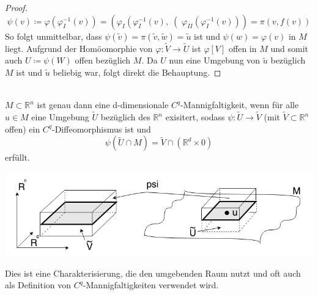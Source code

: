 \begin{proof}
\begin{equation*}
\psi (v) \coloneqq \varphi \left(\varphi_I ^{-1} (v) \right) =
\left( \varphi_I \left(\varphi_I ^{-1} (v),\right( 
\varphi_{II} \left(\varphi_I ^ {-1} (v) \right) \right) = \pi \left(v, f(v)\right)
\end{equation*}
\linebreak
So folgt unmittelbar, dass $\psi (\tilde{v}) = \pi (\tilde{v}, \tilde{w}) = \tilde{u}$ ist und $\psi (w) = \varphi (v)$ in $M$ liegt. Aufgrund der Homöomorphie von $\varphi : \tilde{V} \rightarrow \tilde{U} $ ist $\varphi[V]$ offen in $M$ und somit auch $U\coloneqq\psi(W)$ offen bezüglich $M$. Da $U$ nun eine Umgebung von $\tilde{u}$ bezüglich $M$ ist und $\tilde{u}$ beliebig war, folgt direkt die Behauptung.
\end{proof}

\begin{satz}
\mbox{} \\
$M \subset \mathbb{R}^{n}$ ist genau dann eine d-dimensionale $C^{q}$-Mannigfaltigkeit, wenn für alle $u\in M$ eine Umgebung $\tilde{U}$ bezüglich des $\mathbb{R}^n$ exisitert, sodass $\psi:\tilde{U}\rightarrow\tilde{V}$ (mit $\tilde{V} \subset \mathbb{R}^n$ offen) ein $C^q$-Diffeomorphismus ist und
    \begin{equation*}
    \psi \left( \tilde{U} \cap M \right) =
    \tilde{V} \cap \left( \mathbb{R}^d \times {0} \right) 
    \end{equation*}
erfüllt.
\begin{center}
\includegraphics[scale=0.5]{pictures/002-02}\\
\end{center}
\end{satz}

Dies ist eine Charakterisierung, die den umgebenden Raum nutzt und oft auch als Definition von $C^q$-Mannigfaltigkeiten verwendet wird.
    
